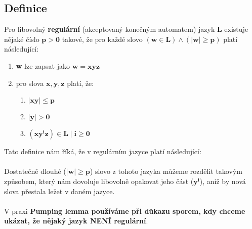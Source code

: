 \documentclass{report}
\begin{document}
    \subsection*{Definice}
    Pro libovolný \textbf{regulární} (akceptovaný konečným automatem) jazyk \textbf{L} existuje nějaké číslo $\mathbf{ p > 0}$ takové, že pro každé slovo $\mathbf{(w \in L)\land({\mid}w{\mid}\ge p)}$ platí následující:
    \begin{enumerate} 
        \item \textbf{w} lze zapsat jako $\mathbf{w=xyz}$ 
        \item pro slova $\mathbf{x,y,z}$ platí, že:
        \begin{enumerate}
            \item $\mathbf{{\mid}xy{\mid}{\leq}p}$
            \item $\mathbf{{\mid}y{\mid}>0}$
            \item $\mathbf{(xy^iz) \in L \mid i\ge0 }$
        \end{enumerate}
    \end{enumerate} 
    Tato definice nám říká, že v regulárním jazyce platí následující:\\ \\
    Dostatečně dlouhé ($\mathbf{{\mid}w{\mid}\ge p}$) slovo z tohoto jazyka můžeme rozdělit takovým způsobem, který nám dovoluje libovolně opakovat jeho část ($\mathbf{y^i}$), aniž by nová slova přestala ležet v daném jazyce.\\ \\
    V praxi \textbf{Pumping lemma používáme při důkazu sporem, kdy chceme ukázat, že nějaký jazyk NENÍ regulární}.
\end{document}
